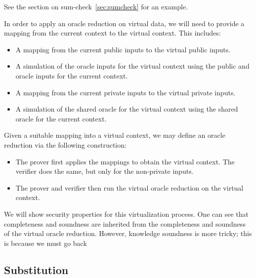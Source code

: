 See the section on sum-check~\ref{sec:sumcheck} for an example.

\begin{definition}
    \label{def:virtual_context_mapping}
    In order to apply an oracle reduction on virtual data, we will need to provide a mapping from the current context to the virtual context. This includes:
    \begin{itemize}
        \item A mapping from the current public inputs to the virtual public inputs.
        \item A simulation of the oracle inputs for the virtual context using the public and oracle
        inputs for the current context.
        \item A mapping from the current private inputs to the virtual private inputs.
        \item A simulation of the shared oracle for the virtual context using the shared oracle for
        the current context.
    \end{itemize}
\end{definition}

\begin{definition}
    \label{def:virtual_oracle_reduction}
    Given a suitable mapping into a virtual context, we may define an oracle reduction via the following construction:
    \begin{itemize}
        \item The prover first applies the mappings to obtain the virtual context. The verifier does the same, but only for the non-private inputs.
        \item The prover and verifier then run the virtual oracle reduction on the virtual context.
    \end{itemize}
\end{definition}

We will show security properties for this virtualization process. One can see that completeness and soundness are inherited from the completeness and soundness of the virtual oracle reduction. However, knowledge soundness is more tricky; this is because we must go back 

\subsection{Substitution}


